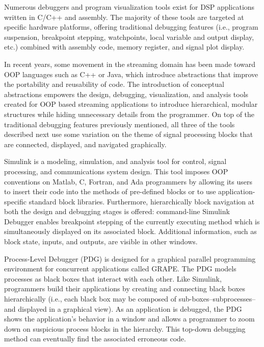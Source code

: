 \documentclass[times, 10pt,twocolumn]{article}
\begin{document}
Numerous  debuggers  and program  visualization  tools  exist for  DSP
applications  written in C/C++  and assembly.   The majority  of these
tools   are  targeted   at  specific   hardware   platforms,  offering
traditional debugging  features (i.e., program  suspension, breakpoint
stepping,  watchpoints,  local  variable  and  output  display,  etc.)
combined with assembly code, memory register, and signal plot display.

In recent years,  some movement in the streaming  domain has been made
toward  OOP   languages  such  as   C++  or  Java,   which  introduce
abstractions   that  improve  the   portability  and   reusability  of
code. The  introduction of conceptual  abstractions empowers
the design,  debugging, visualization, and analysis  tools created for
OOP  based streaming applications  to introduce  hierarchical, modular
structures while  hiding unnecessary  details from the  programmer. On
top of  the traditional  debugging features previously  mentioned, all
three of the  tools described next use some variation  on the theme of
signal processing blocks that  are connected, displayed, and navigated
graphically.

Simulink  is a  modeling, simulation,  and analysis  tool for
control,  signal processing,  and communications  system  design. This
tool  imposes   OOP  conventions  on  Matlab,  C,   Fortran,  and  Ada
programmers  by allowing  its  users  to insert  their  code into  the
methods of pre-defined blocks  or to use application-specific standard
block libraries. Furthermore,  hierarchically block navigation at both
the  design and  debugging  stages is  offered: command-line  Simulink
Debugger enables breakpoint stepping of the currently executing method
which is simultaneously displayed on its associated block.  Additional
information, such as block state,  inputs, and outputs, are visible in
other windows.

Process-Level  Debugger  (PDG) is  designed  for a  graphical
parallel  programming environment  for concurrent  applications called
GRAPE. The PDG models processes as black boxes that interact with each
other. Like Simulink, programmers build their applications by creating
and connecting black boxes hierarchically (i.e., each black box may be
composed  of  sub-boxes--subprocesses--and  displayed in  a  graphical
view). As an application is  debugged, the PDG shows the application's
behavior  in  a  window  and  allows  a programmer  to  zoom  down  on
suspicious process  blocks in the hierarchy.   This top-down debugging
method can eventually find the associated erroneous code.
\end{document}
